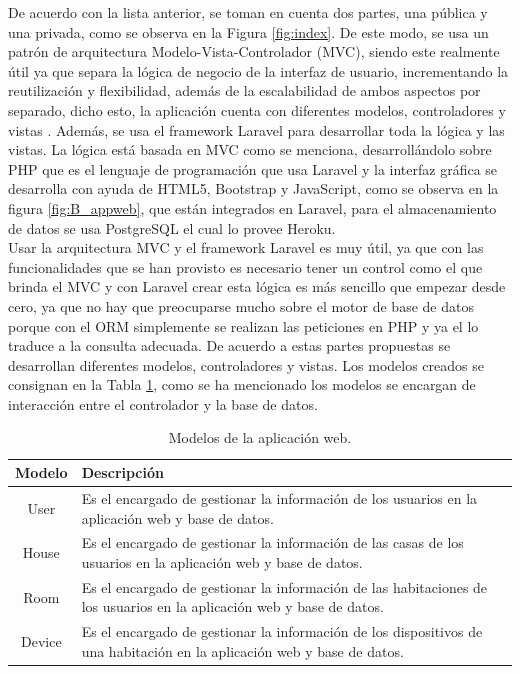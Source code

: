 De acuerdo con la lista anterior, se toman en cuenta dos partes, una pública y una privada, como se observa en la Figura \ref{fig:index}. De este modo, se usa un patrón de arquitectura Modelo-Vista-Controlador (MVC), siendo este realmente útil ya que separa la lógica de negocio de la interfaz de usuario, incrementando la reutilización y flexibilidad, además de la escalabilidad de ambos aspectos por separado, dicho esto, la aplicación cuenta con diferentes modelos, controladores y vistas \cite{MVC1}. Además, se usa el framework Laravel para desarrollar toda la lógica y las vistas. La lógica está basada en MVC como se menciona, desarrollándolo sobre PHP que es el lenguaje de programación que usa Laravel y la interfaz gráfica se desarrolla con ayuda de HTML5, Bootstrap y JavaScript, como se observa en la figura \ref{fig:B_appweb}, que están integrados en Laravel, para el almacenamiento de datos se usa PostgreSQL el cual lo provee Heroku.\\

Usar la arquitectura MVC y el framework Laravel es muy útil, ya que con las funcionalidades que se han provisto es necesario tener un control como el que brinda el MVC y con Laravel crear esta lógica es más sencillo que empezar desde cero, ya que no hay que preocuparse mucho sobre el motor de base de datos porque con el ORM simplemente se realizan las peticiones en PHP y ya el lo traduce a la consulta adecuada. De acuerdo a estas partes propuestas se desarrollan diferentes modelos, controladores y vistas. Los modelos creados se consignan en la Tabla \ref{table:models}, como se ha mencionado los modelos se encargan de interacción entre el controlador y la base de datos.\\

\begin{table}[H]
	\begin{center}
		\caption{Modelos de la aplicación web.}
		\label{table:models}
		\begin{tabular}{|c|p{7cm}|}
			\hline 
			\textbf{Modelo} & \textbf{Descripción} \\ 
			\hline 
			User & Es el encargado de gestionar la información de los usuarios en la aplicación web y base de datos.\\ 
			\hline 
			House & Es el encargado de gestionar la información de las casas de los usuarios en la aplicación web y base de datos.\\ 
			\hline 
			Room & Es el encargado de gestionar la información de las habitaciones de los usuarios en la aplicación web y base de datos.\\ 
			\hline 
			Device & Es el encargado de gestionar la información de los dispositivos de una habitación en la aplicación web y base de datos.\\
			\hline
		\end{tabular} 
	\end{center}
\end{table}

